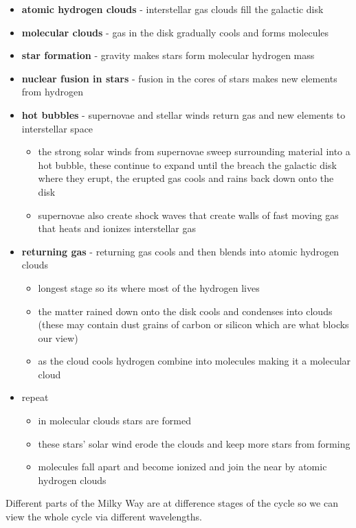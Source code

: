 \documentclass[12pt]{article}
\begin{document}
\begin{itemize}
\item \textbf{atomic hydrogen clouds} - interstellar gas clouds fill the galactic disk
\item \textbf{molecular clouds} - gas in the disk gradually cools and forms molecules
\item \textbf{star formation} - gravity makes stars form molecular hydrogen mass
\item \textbf{nuclear fusion in stars} - fusion in the cores of stars makes new elements from hydrogen
\item \textbf{hot bubbles} - supernovae and stellar winds return gas and new elements to interstellar space
\begin{itemize}
\item the strong solar winds from supernovae sweep surrounding material into a hot bubble, these continue to expand until the breach the galactic disk where they erupt, the erupted gas cools and rains back down onto the disk
\item supernovae also create shock waves that create walls of fast moving gas that heats and ionizes interstellar gas
\end{itemize}
\item \textbf{returning gas} - returning gas cools and then blends into atomic hydrogen clouds
\begin{itemize}
\item longest stage so its where most of the hydrogen lives
\item the matter rained down onto the disk cools and condenses into clouds (these may contain dust grains of carbon or silicon which are what blocks our view)
\item as the cloud cools hydrogen combine into molecules making it a molecular cloud
\end{itemize}
\item repeat
\begin{itemize}
\item in molecular clouds stars are formed
\item these stars' solar wind erode the clouds and keep more stars from forming
\item molecules fall apart and become ionized and join the near by atomic hydrogen clouds
\end{itemize}
\end{itemize}

Different parts of the Milky Way are at difference stages of the cycle so we can view the whole cycle via different wavelengths.
\end{document}
